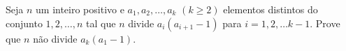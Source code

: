 Seja $n$ um inteiro positivo e $a_1, a_2, \dots, a_k$ $(k \ge 2)$ elementos distintos do conjunto ${1, 2, \dots, n}$ tal que $n$ divide $a_i(a_{i+1}-1)$ para $i = 1, 2, \dots k-1$. Prove que $n$ não divide $a_k(a_1-1)$. 